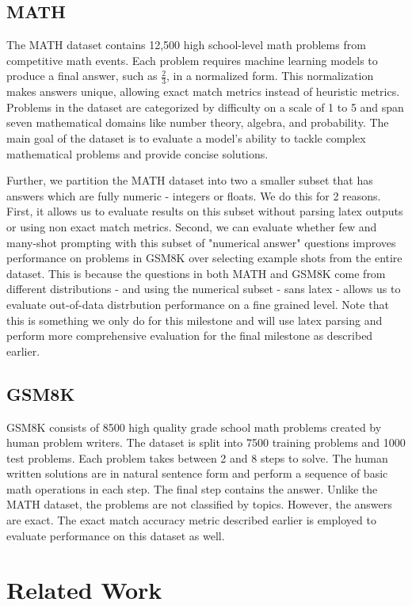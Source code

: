 \documentclass[twocolumn,11pt]{article}
\begin{document}
\subsection{MATH}
The MATH dataset \cite{hendrycksmath2021} contains 12,500 high school-level math problems from competitive math events. Each problem requires machine learning models to produce a final answer, such as $\frac{2}{3}$, in a normalized form. This normalization makes answers unique, allowing exact match metrics instead of heuristic metrics. Problems in the dataset are categorized by difficulty on a scale of 1 to 5 and span seven mathematical domains like number theory, algebra, and probability. The main goal of the dataset is to evaluate a model’s ability to tackle complex mathematical problems and provide concise solutions.

Further, we partition the MATH dataset into two a smaller subset that has answers which are fully numeric - integers or floats. We do this for 2 reasons. First, it allows us to evaluate results on this subset without parsing latex outputs or using non exact match metrics. Second, we can evaluate whether few and many-shot prompting with this subset of "numerical answer" questions improves performance on problems in GSM8K over selecting example shots from the entire dataset. This is because the questions in both MATH and GSM8K come from different distributions - and using the numerical subset - sans latex - allows us to evaluate out-of-data distrbution performance on a fine grained level. Note that this is something we only do for this milestone and will use latex parsing and perform more comprehensive evaluation for the final milestone as described earlier.

\subsection{GSM8K}
GSM8K \cite{cobbe2021gsm8k} consists of 8500 high quality grade school math problems created by human problem writers. The dataset is split into 7500 training problems and 1000 test problems. Each problem takes between 2 and 8 steps to solve. The human written solutions are in natural sentence form and perform a sequence of basic math operations in each step. The final step contains the answer. Unlike the MATH dataset, the problems are not classified by topics. However, the answers are exact. The exact match accuracy metric described earlier is employed to evaluate performance on this dataset as well.

\section{Related Work}
\end{document}
